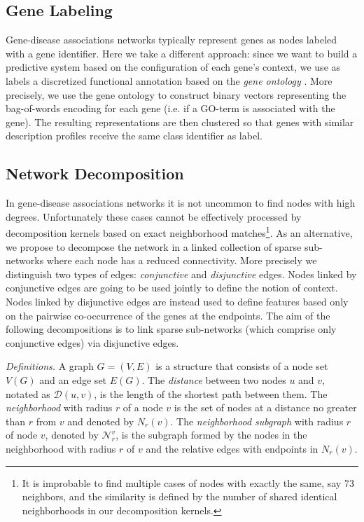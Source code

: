\documentclass{esannV2}
\begin{document}
\subsection{Gene Labeling} Gene-disease associations networks typically represent genes as nodes labeled with a gene identifier. Here we take a different approach: since we want to build a predictive system based on the
configuration of each gene's context, we use as labels a discretized functional annotation based on the \textit{gene ontology} \cite{ontology}. More precisely,  we use the gene ontology to construct binary vectors
representing the bag-of-words encoding for each gene (i.e. if a GO-term is associated with the gene). The resulting representations are then clustered so that genes with similar description profiles receive the same class identifier as label.
\subsection{Network Decomposition} 
In gene-disease associations networks it is not uncommon to find nodes with high degrees. Unfortunately these cases cannot be effectively processed by decomposition kernels based on exact neighborhood matches\footnote{It is improbable to find multiple cases of nodes with exactly the same, say 73 neighbors, and the similarity is defined by the number of shared identical neighborhoods in our decomposition kernels.}. As an alternative, we propose to decompose the network in a linked collection of sparse sub-networks where each node has a reduced connectivity. More precisely we distinguish two types of edges: {\em conjunctive} and {\em disjunctive} edges. Nodes linked by conjunctive edges are going to be used jointly to define the notion of context. Nodes linked by disjunctive edges are instead used to define features based only on the
pairwise co-occurrence of the genes at the endpoints. The aim of the following decompositions is to link sparse sub-networks (which comprise only conjunctive edges) via disjunctive edges. 

\textit{Definitions.} A graph $G = (V,E)$ is a structure that consists of a node set $V(G)$ and an edge set $E(G)$. The \textit{distance} between two nodes $u$ and $v$, notated as $\mathcal{D}(u,v)$, is the length of the shortest path between them. The \textit{neighborhood} with radius $r$ of a node $v$ is the set of nodes
at a distance no greater than $r$ from $v$ and denoted by $N_r(v)$. The \textit{neighborhood subgraph} with radius $r$ of node $v$, denoted by $\mathcal{N}_{r}^{v}$,  is the subgraph formed by the nodes in the
neighborhood with radius $r$ of $v$ and the relative edges with endpoints in $N_r(v)$.
\end{document}
